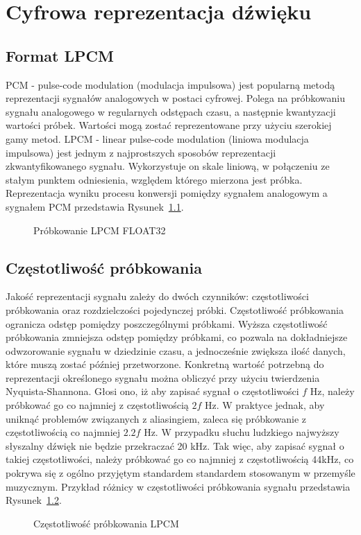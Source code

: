 \chapter{Cyfrowa reprezentacja dźwięku}

\section{Format LPCM}
PCM - pulse-code modulation (modulacja impulsowa) jest popularną metodą reprezentacji sygnałów analogowych w postaci cyfrowej. Polega na próbkowaniu sygnału analogowego w regularnych odstępach czasu, a następnie kwantyzacji wartości próbek. Wartości mogą zostać reprezentowane przy użyciu szerokiej gamy metod. LPCM - linear pulse-code modulation (liniowa modulacja impulsowa) jest jednym z najprostszych sposobów reprezentacji zkwantyfikowanego sygnału. Wykorzystuje on skale liniową, w połączeniu ze stałym punktem odniesienia, względem którego mierzona jest próbka. Reprezentacja wyniku procesu konwersji pomiędzy sygnałem analogowym a sygnałem PCM przedstawia Rysunek~\ref{fig:Próbkowanie LPCM FLOAT32}.
\begin{figure}
    \centering
    \scalebox{1.0}{}
    \caption{Próbkowanie LPCM FLOAT32}
    \label{fig:Próbkowanie LPCM FLOAT32}
\end{figure}

\section{Częstotliwość próbkowania}
Jakość reprezentacji sygnału zależy do dwóch czynników: częstotliwości próbkowania oraz rozdzielczości pojedynczej próbki. Częstotliwość próbkowania ogranicza odstęp pomiędzy poszczególnymi próbkami. Wyższa częstotliwość próbkowania zmniejsza odstęp pomiędzy próbkami, co pozwala na dokładniejsze odwzorowanie sygnału w dziedzinie czasu, a jednocześnie zwiększa ilość danych, które muszą zostać później przetworzone. Konkretną wartość potrzebną do reprezentacji określonego sygnału można obliczyć przy użyciu twierdzenia Nyquista-Shannona. Głosi ono, iż aby zapisać sygnał o częstotliwości $f$ Hz, należy próbkować go co najmniej z częstotliwością $2f$ Hz. W praktyce jednak, aby uniknąć problemów związanych z aliasingiem, zaleca się próbkowanie z częstotliwością co najmniej $2.2f$ Hz. W przypadku słuchu ludzkiego najwyższy słyszalny dźwięk nie będzie przekraczać 20 kHz. Tak więc, aby zapisać sygnał o takiej częstotliwości, należy próbkować go co najmniej z częstotliwością 44kHz, co pokrywa się z ogólno przyjętym standardem standardem stosowanym w przemyśle muzycznym. Przykład różnicy w częstotliwości próbkowania sygnału przedstawia Rysunek~\ref{fig:Częstotliwość próbkowania LPCM}.
\begin{figure}
    \centering
    \scalebox{1.0}{}
    \caption{Częstotliwość próbkowania LPCM}
    \label{fig:Częstotliwość próbkowania LPCM}
\end{figure}


